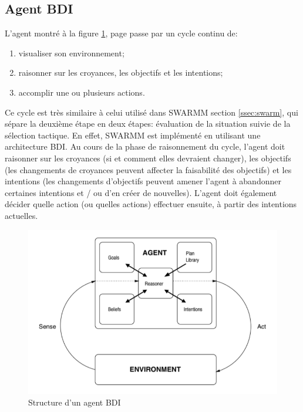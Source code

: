 \subsection{Agent BDI} \label{bdiA}

L'agent montré à la figure \ref{fig:bdi}, page \pageref{fig:bdi} \parencite{norling2000enhancing} passe par un cycle continu de:

\begin{enumerate}
\item visualiser son environnement;
\item raisonner sur les croyances, les objectifs et les intentions;
\item accomplir une ou plusieurs actions.
\end{enumerate}

Ce cycle est très similaire à celui utilisé dans SWARMM section \ref{ssec:swarm}, qui sépare la deuxième étape en deux étapes: évaluation de la situation suivie de la sélection tactique. En effet, SWARMM est implémenté en utilisant une architecture BDI. Au cours de la phase de raisonnement du cycle, l'agent doit raisonner sur les croyances (si et comment elles devraient changer), les objectifs (les changements de croyances peuvent affecter la faisabilité des objectifs) et les intentions (les changements d'objectifs peuvent amener l'agent à abandonner certaines intentions et / ou d’en créer de nouvelles). L'agent doit également décider quelle action (ou quelles actions) effectuer ensuite, à partir des intentions actuelles.


\begin{figure}[th]
\centering
\includegraphics{Figures/bdi.PNG}
\decoRule
\caption[ Structure d’un agent BDI ] { Structure d’un agent BDI }
\label{fig:bdi}
\end{figure}


